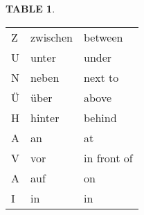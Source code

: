 \documentclass[a4paper,twocolumn,10pt]{article}
\newtheorem{mytable}{TABLE}[section]
\begin{document}
\begin{table-bg}[width=\linewidth]{}

\begin{table-title}[width=6.5cm]{}
		\captionsetup{labelformat=empty}
	\end{table-title}

	\begin{table-theword}
		\footnotesize \begin{mytable}\label{table:prepositions_wechsel} \end{mytable}
	\end{table-theword}

	\begin{table-content}
	\begin{tabularx}{\textwidth}{l|XX}

		\cellcolor{gray-light} Z &
		\cellcolor{white} zwischen &
		\cellcolor{white} between\\

		\cellcolor{gray-light} U&
		\cellcolor{white} unter &
		\cellcolor{white} under\\

		\cellcolor{gray-light} N&
		\cellcolor{white} neben &
		\cellcolor{white} next to\\

		\cellcolor{gray-light} Ü&
		\cellcolor{white} über &
		\cellcolor{white} above\\

		\cellcolor{gray-light} H&
		\cellcolor{white} hinter &
		\cellcolor{white} behind \\

		\cellcolor{gray-light} A&
		\cellcolor{white} an &
		\cellcolor{white} at \\

		\cellcolor{gray-light} V&
		\cellcolor{white} vor &
		\cellcolor{white} in front of \\

		\cellcolor{gray-light} A&
		\cellcolor{white} auf &
		\cellcolor{white} on \\

		\cellcolor{gray-light} I&
		\cellcolor{white} in &
		\cellcolor{white} in \\

	\end{tabularx}
	\end{table-content}

\end{table-bg}
\end{document}
